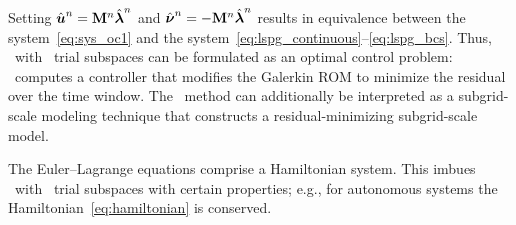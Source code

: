 Setting 
${\hat{\boldsymbol u}^{n}} = \mathbf{M}^{n} \hat{\boldsymbol \lambda}^{n}$ and
$\hat{\boldsymbol \nu}^{n} = -\mathbf{M}^{n} \hat{\boldsymbol \lambda}^{n}$ results in equivalence
between the system~\eqref{eq:sys_oc1} and the
system~\eqref{eq:lspg_continuous}--\eqref{eq:lspg_bcs}.
Thus, \methodAcronym\ with \spatialAcronym\ trial subspaces can be formulated
as an optimal control problem: \methodAcronym\ computes a controller that
modifies the Galerkin ROM to minimize the residual over the time window. 
The \methodAcronym\ method can additionally be
interpreted as a subgrid-scale modeling technique that constructs a
residual-minimizing subgrid-scale model.

\begin{remark}
The Euler--Lagrange equations comprise a Hamiltonian system. This imbues \methodAcronym\ with \spatialAcronym\ trial subspaces with certain properties; e.g., for autonomous systems the Hamiltonian~\eqref{eq:hamiltonian} is conserved. 
\end{remark} 

